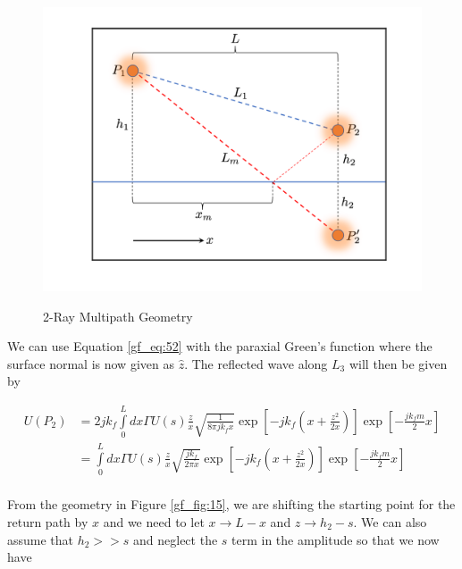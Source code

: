\begin{figure}[ht]
  \begin{center}
\includegraphics[width=5in]{../media/analysis/multipath_2_ray.png}
  \end{center}
  \renewcommand{\baselinestretch}{1} \small\normalsize
  \begin{quote}
    \caption[2-Ray Multipath Geometry]{2-Ray Multipath Geometry\label{gf_fig:15a}}
  \end{quote}
\end{figure}
\renewcommand{\baselinestretch}{2} \small\normalsize

We can use Equation \ref{gf_eq:52} with the paraxial Green's function where the surface normal is now given as $\hat{z}$. The reflected wave along $L_3$ will then be given by

\begin{equation}
\begin{aligned}
U(P_2) &= 2jk_f\int\limits_{0}^{L}dx\Gamma U(s)\frac{z}{x}\sqrt{\frac{1}{8\pi jk_f x}}\exp\left[-jk_f\left(x +\frac{z^2}{2x} \right) \right]\exp\left[-\frac{jk_fm}{2}x\right] \\
&= \int\limits_{0}^{L}dx\Gamma U(s)\frac{z}{x}\sqrt{\frac{jk_f}{2\pi x}}\exp\left[-jk_f\left(x +\frac{z^2}{2x} \right) \right]\exp\left[-\frac{jk_fm}{2}x\right] \\
\end{aligned}
\label{gf_eq:55}
\end{equation}
\renewcommand{\baselinestretch}{2} \small\normalsize

From the geometry in Figure \ref{gf_fig:15}, we are shifting the starting point for the return path by $x$ and we need to let $x \rightarrow L-x$ and $z \rightarrow h_2-s$. We can also assume that $h_2 >> s$ and neglect the $s$ term in the amplitude so that we now have


